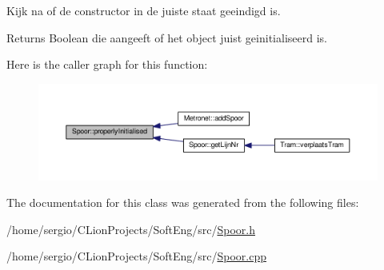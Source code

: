 Kijk na of de constructor in de juiste staat geeindigd is. 

\begin{DoxyReturn}{Returns}
Boolean die aangeeft of het object juist geinitialiseerd is. 
\end{DoxyReturn}
Here is the caller graph for this function\+:
\nopagebreak
\begin{figure}[H]
\begin{center}
\leavevmode
\includegraphics[width=350pt]{class_spoor_a1eb7c54228676cdb7c8620104e063a3c_icgraph}
\end{center}
\end{figure}


The documentation for this class was generated from the following files\+:\begin{DoxyCompactItemize}
\item 
/home/sergio/\+C\+Lion\+Projects/\+Soft\+Eng/src/\hyperlink{_spoor_8h}{Spoor.\+h}\item 
/home/sergio/\+C\+Lion\+Projects/\+Soft\+Eng/src/\hyperlink{_spoor_8cpp}{Spoor.\+cpp}\end{DoxyCompactItemize}
